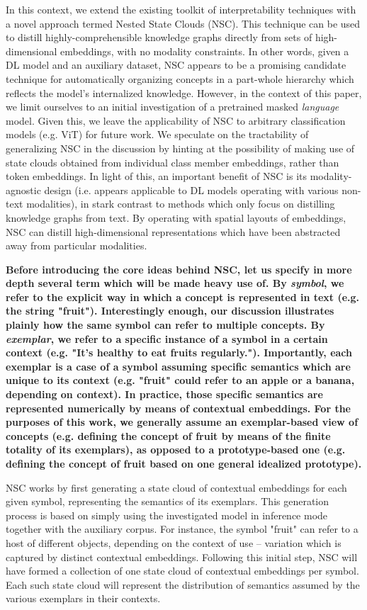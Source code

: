 In this context, we extend the existing toolkit of interpretability techniques with a novel approach termed Nested State Clouds (NSC). This technique can be used to distill highly-comprehensible knowledge graphs directly from sets of high-dimensional embeddings, with no modality constraints. In other words, given a DL model and an auxiliary dataset, NSC appears to be a promising candidate technique for automatically organizing concepts in a part-whole hierarchy which reflects the model's internalized knowledge. However, in the context of this paper, we limit ourselves to an initial investigation of a pretrained masked \textit{language} model. Given this, we leave the applicability of NSC to arbitrary classification models (e.g. ViT) for future work. We speculate on the tractability of generalizing NSC in the discussion by hinting at the possibility of making use of state clouds obtained from individual class member embeddings, rather than token embeddings. In light of this, an important benefit of NSC is its modality-agnostic design (i.e. appears applicable to DL models operating with various non-text modalities), in stark contrast to methods which only focus on distilling knowledge graphs from text. By operating with spatial layouts of embeddings, NSC can distill high-dimensional representations which have been abstracted away from particular modalities.

\textbf{Before introducing the core ideas behind NSC, let us specify in more depth several term which will be made heavy use of. By \textit{symbol}, we refer to the explicit way in which a concept is represented in text (e.g. the string "fruit"). Interestingly enough, our discussion illustrates plainly how the same symbol can refer to multiple concepts. By \textit{exemplar}, we refer to a specific instance of a symbol in a certain context (e.g. "It's healthy to eat \textbf{fruit}s regularly."). Importantly, each exemplar is a case of a symbol assuming specific semantics which are unique to its context (e.g. "fruit" could refer to an apple or a banana, depending on context). In practice, those specific semantics are represented numerically by means of contextual embeddings. For the purposes of this work, we generally assume an exemplar-based view of concepts (e.g. defining the concept of fruit by means of the finite totality of its exemplars), as opposed to a prototype-based one (e.g. defining the concept of fruit based on one general idealized prototype).}

NSC works by first generating a state cloud of contextual embeddings for each given symbol, representing the semantics of its exemplars. This generation process is based on simply using the investigated model in inference mode together with the auxiliary corpus. For instance, the symbol "fruit" can refer to a host of different objects, depending on the context of use -- variation which is captured by distinct contextual embeddings. Following this initial step, NSC will have formed a collection of one state cloud of contextual embeddings per symbol. Each such state cloud will represent the distribution of semantics assumed by the various exemplars in their contexts.

